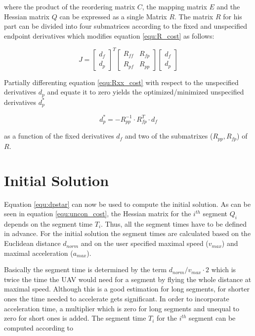 where the product of the reordering matrix $C$, the mapping matrix $E$ and the Hessian matrix $Q$ can be expressed as a single Matrix $R$. The matrix $R$ for his part can be divided into four submatrices according to the fixed and unspecified endpoint derivatives which modifies equation \ref{equ:R_cost} as follows:

\begin{equation}
J =
\begin{bmatrix}
   d_f \\
  d_p
\end{bmatrix}^T
\begin{bmatrix}
   R_{ff} & R_{fp} \\
  R_{pf} & R_{pp}
\end{bmatrix}
\begin{bmatrix}
   d_f \\
  d_p
\end{bmatrix}
\label{equ:Rxx_cost}
\end{equation}

Partially differenting equation \ref{equ:Rxx_cost} with respect to the unspecified derivatives $d_p$ and equate it to zero yields the optimized/minimized unspecified derivatives $d_p^*$ 

\begin{equation}
d_p^* = - R_{pp}^{-1} \cdot R_{fp}^T \cdot d_f
\label{equ:dpstar}
\end{equation}

as a function of the fixed derivatives $d_f$ and two of the submatrixes ($R_{pp}, R_{fp}$) of $R$.


\section{Initial Solution}\label{sec:initialSolution}

Equation \ref{equ:dpstar} can now be used to compute the initial solution. As can be seen in equation \ref{equ:uncon_cost}, the Hessian matrix for the  $ i^{th}$ segment $Q_i$ depends on the segment time $T_i$. Thus, all the segment times have to be defined in advance. For the initial solution the segment times are calculated based on the Euclidean distance $d_{norm}$ and on the user specified maximal speed ($v_{max}$) and maximal acceleration ($a_{max}$). \newline

Basically the segment time is determined by the term $d_{norm}/v_{max} \cdot 2$ which is twice the time the UAV would need for a segment by flying the whole distance at maximal speed. Although this is a good estimation for long segments, for shorter ones the time needed to accelerate gets significant. In order to incorporate acceleration time, a multiplier which is zero for long segments and unequal to zero for short ones is added. The segment time $T_i$ for the $i^{th}$ segment can be computed according to 

